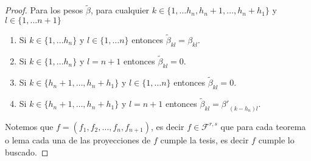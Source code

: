 \begin{proof}
    Para los pesos $\tilde{\beta}$, para cualquier
    $k \in \{1, \ldots h_n, h_{n} + 1, \ldots, h_n + h_1\}$ y  
    $l \in \{1, \ldots n+1 \}$ 
    \begin{enumerate}
        \item Si $k \in \{1, \ldots h_n \}$ y $l \in \{1, \ldots n\}$ 
        entonces $\tilde{\beta}_{k l} = \beta_{k l}.$
        \item Si $k \in \{1, \ldots h_n \}$ y $l=n+1$ 
        entonces $\tilde{\beta}_{k l} = 0.$
        \item Si $k \in \{h_{n} + 1, \ldots, h_n + h_1 \}$ 
        y $l \in \{1, \ldots n\}$ 
        entonces $\tilde{\beta}_{k l} = 0.$
        \item Si $k \in \{h_{n} + 1, \ldots, h_n + h_1 \}$ 
        y $l=n+1$ 
        entonces 
        $\tilde{\beta}_{k l} = {\beta '}_{(k- h_n) l}.$
    \end{enumerate}

    Notemos que $f=(f_1, f_2, \ldots, f_n, f_{n+1})$, es decir $f \in \mathcal{F}^{r,s}$ que para cada teorema o lema
    cada una de las proyecciones de $f$ cumple la tesis, es decir $f$ cumple lo buscado. 
\end{proof}

